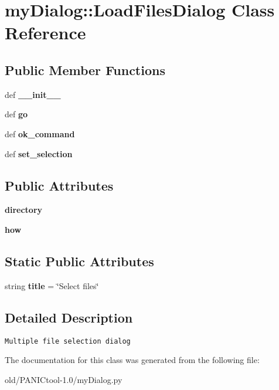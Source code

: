 \section{my\-Dialog::Load\-Files\-Dialog Class Reference}
\label{classmyDialog_1_1LoadFilesDialog}
\subsection*{Public Member Functions}
\begin{CompactItemize}
\item 
def \textbf{\_\-\_\-init\_\-\_\-}\label{classmyDialog_1_1LoadFilesDialog_1b674e493bc262cdf05861779f04fbf0}

\item 
def \textbf{go}\label{classmyDialog_1_1LoadFilesDialog_4ae95e77aee5a104b094bfeeb99a3910}

\item 
def \textbf{ok\_\-command}\label{classmyDialog_1_1LoadFilesDialog_e79cd0aa70acb762a66bb90b2ab63593}

\item 
def \textbf{set\_\-selection}\label{classmyDialog_1_1LoadFilesDialog_a83679aabb20a8ab6b720896bb012548}

\end{CompactItemize}
\subsection*{Public Attributes}
\begin{CompactItemize}
\item 
\textbf{directory}\label{classmyDialog_1_1LoadFilesDialog_da1bf2cf644edec20f3bcf7e8909dbf8}

\item 
\textbf{how}\label{classmyDialog_1_1LoadFilesDialog_57baf570cf7af12f86f239dd1275e259}

\end{CompactItemize}
\subsection*{Static Public Attributes}
\begin{CompactItemize}
\item 
string \textbf{title} = \char`\"{}Select files\char`\"{}\label{classmyDialog_1_1LoadFilesDialog_1d6e91ba7684b5a5aa74b55bcf1e6d53}

\end{CompactItemize}


\subsection{Detailed Description}


\footnotesize\begin{verbatim}Multiple file selection dialog\end{verbatim}
\normalsize
 



The documentation for this class was generated from the following file:\begin{CompactItemize}
\item 
old/PANICtool-1.0/my\-Dialog.py\end{CompactItemize}
